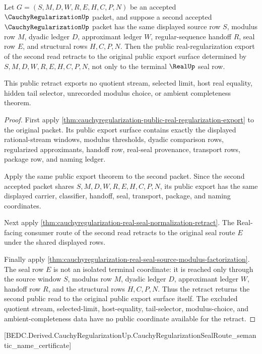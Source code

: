\begin{theorem}
\label{thm:cauchyregularization-public-normalization-retract-export}
Let $G=(S,M,D,W,R,E,H,C,P,N)$ be an accepted
$\CauchyRegularizationUp$ packet, and suppose a second accepted
$\CauchyRegularizationUp$ packet has the same displayed source row $S$,
modulus row $M$, dyadic ledger $D$, approximant ledger $W$,
regular-sequence handoff $R$, seal row $E$, and structural rows $H,C,P,N$.
Then the public real-regularization export of the second read retracts to the
original public export surface determined by $S,M,D,W,R,E,H,C,P,N$, not only
to the terminal $\RealUp$ seal row.

This public retract exports no quotient stream, selected limit, host real
equality, hidden tail selector, unrecorded modulus choice, or ambient
completeness theorem.
\end{theorem}
\begin{proof}
First apply
\autoref{thm:cauchyregularization-public-real-regularization-export} to the
original packet. Its public export surface contains exactly the displayed
rational-stream windows, modulus thresholds, dyadic comparison rows,
regularized approximants, handoff row, real-seal provenance, transport rows,
package row, and naming ledger.

Apply the same public export theorem to the second packet. Since the second
accepted packet shares $S,M,D,W,R,E,H,C,P,N$, its public export has the same
displayed carrier, classifier, handoff, seal, transport, package, and naming
coordinates.

Next apply
\autoref{thm:cauchyregularization-real-seal-normalization-retract}. The
Real-facing consumer route of the second read retracts to the original seal
route $E$ under the shared displayed rows.

Finally apply
\autoref{thm:cauchyregularization-real-seal-source-modulus-factorization}.
The seal row $E$ is not an isolated terminal coordinate: it is reached only
through the source window $S$, modulus row $M$, dyadic ledger $D$,
approximant ledger $W$, handoff row $R$, and the structural rows $H,C,P,N$.
Thus the retract returns the second public read to the original public export
surface itself. The excluded quotient stream, selected-limit, host-equality,
tail-selector, modulus-choice, and ambient-completeness data have no public
coordinate available for the retract.
\end{proof}

[BEDC.Derived.CauchyRegularizationUp.CauchyRegularizationSealRoute\_semantic\_name\_certificate]

